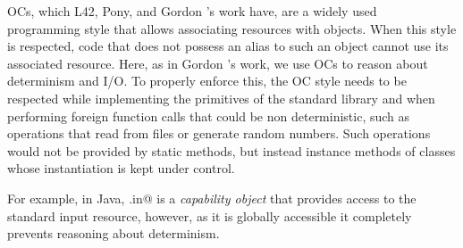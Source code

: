 
OCs, which L42, Pony, and Gordon \etal's work have, are a widely used~\cite{miller2003capability,
noble2016abstract,karger1988improving} programming style that allows associating resources with objects. When this style
is respected, code that does not possess an alias to such an object cannot use its associated resource.
Here, as in Gordon \etal's work, we use OCs to reason about determinism and I/O. To properly enforce this, the OC style needs to be respected while implementing the primitives of the standard library and when performing foreign function calls that could be non deterministic, such as operations that read from files or generate random numbers. Such operations would not be provided by static methods, but instead instance methods of classes whose instantiation is kept under control. 




\lstset{language=Java}
 For example, in Java, \Q@System.in@
 \lstset{language=FortyTwo} 
  is a \emph{capability object} that provides access to the standard input resource, however, as it is globally accessible it completely prevents reasoning about determinism. 

